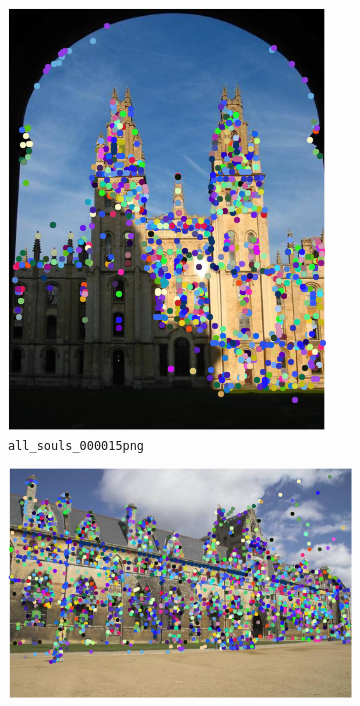 \documentclass[a4paper,10pt,twoside]{article}
\begin{document}
\begin{figure}
\begin{subfigure}{0.49\textwidth}
    \includegraphics[width=\textwidth,height=.3\textheight,keepaspectratio]{randomimage3}
    \caption{\texttt{all\_souls\_000015png}}
    \label{sfig:as15}
  \end{subfigure}
  \begin{subfigure}{0.49\textwidth}
    \centering
    \includegraphics[width=\textwidth,height=.3\textheight,keepaspectratio]{randomimage4}

\end{subfigure}
\end{figure}
\end{document}
